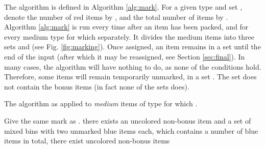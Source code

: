 The algorithm {\MarkItems} is defined in Algorithm \ref{alg:mark}. 
For a given type  and set ,
denote the number of red items by ,
and the total number of items by . 
Algorithm \ref{alg:mark} is run every time after an item has been packed, 
and for every medium type  for which  separately.
It divides the medium items into three sets  and  (see Fig. \ref{fig:marking}). 
Once assigned, an item remains in a set
until the end of the input (after which it may be reassigned, see Section \ref{sec:final}). In many cases, the algorithm will have nothing to do, as none of the conditions hold.
Therefore, some items will remain temporarily unmarked, in a set . 
The set  does not contain the bonus items (in fact none of the sets does).

\begin{algorithm}[!t]
\caption{\label{alg:mark}
The algorithm {\MarkItems} as applied to \emph{medium} items of type  for which .}
\begin{algorithmic}[1]
\State Give  the same mark  as . \label{mark:1}
\State  \label{mark:2}
\EndIf
{}
\State{ 
 \label{mark:newr3}}
\EndIf
{}
\If
{there exists an uncolored non-bonus item and a set of mixed bins with 
two unmarked blue items each, which contains a number
 of blue items in total, \label{mark:newblue1}} 
\State{,  }
\EndIf
{}
\If
{there exist  uncolored non-bonus items
\label{mark:check}}
\State{, \label{mark:newind5}}
\EndIf
\end{algorithmic}
\end{algorithm}































